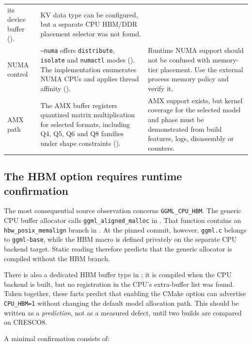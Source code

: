 \begin{table}[htbp]
\begin{tabularx}{\textwidth}{@{}P{2.8cm}P{5.35cm}Y@{}}
  its device buffer
  ().
& KV data type can be configured, but a separate CPU HBM/DDR placement
  selector was not found. \\
\addlinespace
NUMA control
& \texttt{--numa} offers \texttt{distribute}, \texttt{isolate} and
  \texttt{numactl} modes
  ().  The implementation enumerates
  NUMA CPUs and applies thread affinity
  ().
& Runtime NUMA support should not be confused with memory-tier
  placement.  Use the external process memory policy and verify it. \\
\addlinespace
AMX path
& The AMX buffer registers quantized matrix multiplication for selected
  formats, including Q4, Q5, Q6 and Q8 families under shape constraints
  ().
& AMX support exists, but kernel coverage for the selected model and
  phase must be demonstrated from build features, logs, disassembly or
  counters. \\
\bottomrule
\end{tabularx}
\end{table}

\subsection{The HBM option requires runtime confirmation}

The most consequential source observation concerns
\texttt{GGML\_CPU\_HBM}.  The generic CPU buffer allocator calls
\texttt{ggml\_aligned\_malloc} in
.  That function contains an
\texttt{hbw\_posix\_memalign} branch in
.  At the pinned commit, however,
\texttt{ggml.c} belongs to \texttt{ggml-base}, while the HBM macro is
defined privately on the separate CPU backend target.  Static reading
therefore predicts that the generic allocator is compiled without the
HBM branch.

There is also a dedicated HBM buffer type in ; it is
compiled when the CPU backend is built, but no registration in the
CPU's extra-buffer list was found.  Taken together, these facts predict
that enabling the CMake option can advertise \texttt{CPU\_HBM=1}
without changing the default model allocation path.  This should be
written as a \emph{prediction}, not as a measured defect, until two
builds are compared on CRESCO8.

A minimal confirmation consists of:

